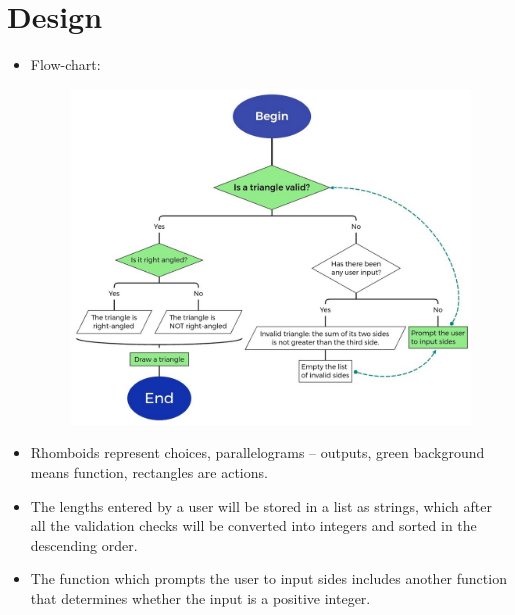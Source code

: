\documentclass{article}
\begin{document}
\section{Design}
\begin{itemize}
    \item Flow-chart:

\begin{figure}[h]
	\includegraphics[scale=0.35]{flow-chart.jpg}
	\centering
\end{figure}

    \item Rhomboids represent choices, parallelograms -- outputs, green
        background means function, rectangles are actions.

    \item The lengths entered by a user will be stored in a list as strings,
        which after all the validation checks will be converted into integers
        and sorted in the descending order.

    \item The function which prompts the user to input sides includes another
        function that determines whether the input is a positive integer.


\end{itemize}
\end{document}
